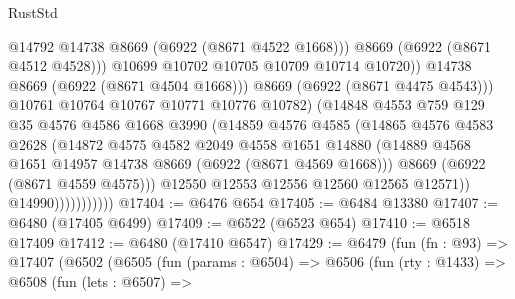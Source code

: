\begin{lexlean}{RustStd}
\begin{coremodule}
                                      @14792
                                      @14738
                                      @8669
                                      (@6922 (@8671 @4522 @1668)))
                                    @8669
                                    (@6922 (@8671 @4512 @4528)))
                                  @10699
                                  @10702
                                  @10705
                                  @10709
                                  @10714
                                  @10720))
                              @14738
                              @8669
                              (@6922 (@8671 @4504 @1668)))
                            @8669
                            (@6922 (@8671 @4475 @4543)))
                          @10761
                          @10764
                          @10767
                          @10771
                          @10776
                          @10782)
                        (@14848
                          @4553
                          @759
                          @129
                          @35
                          @4576
                          @4586
                          @1668
                          @3990
                          (@14859
                            @4576
                            @4585
                            (@14865
                              @4576
                              @4583
                              @2628
                              (@14872
                                @4575
                                @4582
                                @2049
                                @4558
                                @1651
                                @14880
                                (@14889 @4568 @1651 @14957 @14738 @8669 (@6922 (@8671 @4569 @1668)))
                                @8669
                                (@6922 (@8671 @4559 @4575)))
                              @12550
                              @12553
                              @12556
                              @12560
                              @12565
                              @12571))
                          @14990)))))))))))
@17404 := @6476 @654
@17405 := @6484 @13380
@17407 := @6480 (@17405 @6499)
@17409 := @6522 (@6523 @654)
@17410 := @6518 @17409
@17412 := @6480 (@17410 @6547)
@17429 := @6479
    (fun (fn : @93) =>
    @17407
      (@6502
        (@6505
          (fun (params : @6504) =>
          @6506
            (fun (rty : @1433) =>
            @6508
              (fun (lets : @6507) =>

\end{coremodule}
\end{lexlean}
